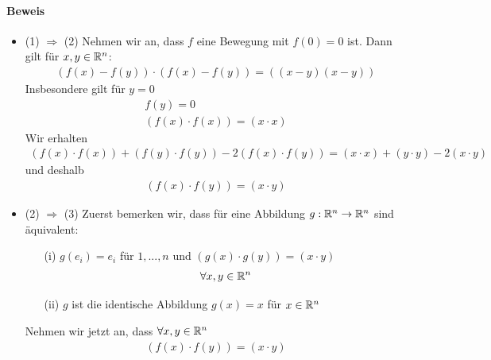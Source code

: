 \paragraph{Beweis}
\begin{itemize}
\item (1) $\Rightarrow$ (2) Nehmen wir an, dass $f$ eine Bewegung mit $f(0) = 0$ ist. Dann gilt für $x, y \in \mathbb{R}^n$:
\begin{align}
(f(x)-f(y))\cdot (f(x)-f(y)) = ((x-y)(x-y))
\end{align}
Insbesondere gilt für $y = 0$
\begin{align}
f(y) = 0 \\
(f(x) \cdot f(x)) = (x\cdot x)
\end{align}
Wir erhalten
\begin{align}
(f(x)\cdot f(x)) + (f(y)\cdot f(y)) - 2(f(x)\cdot f(y)) = (x \cdot x) + (y \cdot y) - 2 (x \cdot y)
\end{align}
und deshalb
\begin{align}
(f(x) \cdot f(y)) = (x \cdot y)
\end{align}

\item (2) $\Rightarrow$ (3) Zuerst bemerken wir, dass für eine Abbildung $g: \mathbb{R}^n \rightarrow \mathbb{R}^n$ sind äquivalent:
\begin{itemize}
\item[(i)] $g(e_i) = e_i$ für $1, ..., n$ und $(g(x)\cdot g(y)) = (x \cdot y)$
\begin{align}
\forall x, y \in \mathbb{R}^n
\end{align}
\item[(ii)] $g$ ist die identische Abbildung $g(x) = x$ für $x \in \mathbb{R}^n$
\end{itemize}
Nehmen wir jetzt an, dass $\forall x, y \in \mathbb{R}^n$
\begin{align}
(f(x) \cdot f(y)) = (x \cdot y)
\end{align}


\end{itemize}
